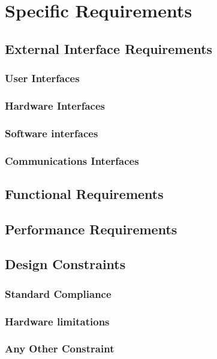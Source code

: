 \chapter{Specific Requirements}

\section{External Interface Requirements}

\subsection{User Interfaces}
\subsection{Hardware Interfaces}
\subsection{Software interfaces}
\subsection{Communications Interfaces}

\section{Functional Requirements}

\section{Performance Requirements}

\section{Design Constraints}

\subsection{Standard Compliance}
\subsection{Hardware limitations}
\subsection{Any Other Constraint}

